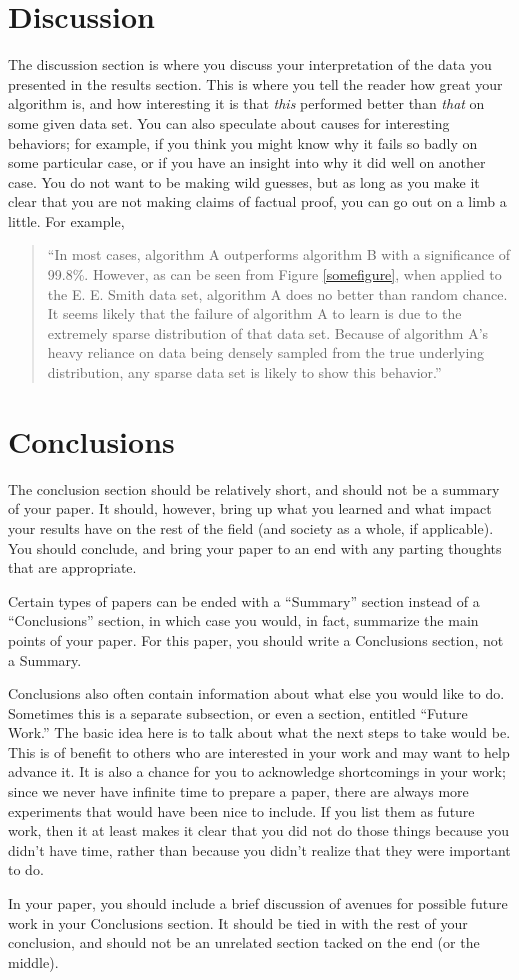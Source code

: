 \documentclass[12pt,letterpaper]{article}
\begin{document}
\section{Discussion}
The discussion section is where you discuss your interpretation of the data you
presented in the results section.  This is where you tell the reader how great
your algorithm is, and how interesting it is that \emph{this} performed better
than \emph{that} on some given data set.  You can also speculate about causes
for interesting behaviors; for example, if you think you might know why it fails
so badly on some particular case, or if you have an insight into why it did well
on another case.  You do not want to be making wild guesses, but as long as you
make it clear that you are not making claims of factual proof, you can go out on
a limb a little.  For example,

\begin{quote}
``In most cases, algorithm A outperforms algorithm B with a significance of
99.8\%.  However, as can be seen from Figure \ref{somefigure}, when applied to
the E. E. Smith data set, algorithm A does no better than random chance.  It
seems likely that the failure of algorithm A to learn is due to the extremely
sparse distribution of that data set.  Because of algorithm A's heavy reliance
on data being densely sampled from the true underlying distribution, any sparse
data set is likely to show this behavior.''
\end{quote}

\section{Conclusions}
The conclusion section should be relatively short, and should not be a summary
of your paper.  It should, however, bring up what you learned and what impact
your results have on the rest of the field (and society as a
whole, if applicable).  You should conclude, and bring your paper to an  end
with any parting thoughts that are appropriate.

Certain types of papers can be ended with a ``Summary'' section instead of a
``Conclusions'' section, in which case you would, in fact, summarize the main
points of your paper.  For this paper, you should write a Conclusions section,
not a Summary.

Conclusions also often contain information about what else you would like
to do.  Sometimes this is a separate subsection, or even a section, entitled
``Future Work.''  The basic idea here is to talk about what the next steps to
take would be.  This is of benefit to others who are interested in your
work and may want to help advance it.  It is also a chance for you to
acknowledge shortcomings in your work; since we never have infinite time to
prepare a paper, there are always more experiments that would have been nice to
include.  If you list them as future work, then it at least makes it clear that
you did not do those things because you didn't have time, rather than because you
didn't realize that they were important to do.

In your paper, you should include a brief discussion of avenues for possible
future work in your Conclusions section.  It should be tied in with the rest of
your conclusion, and should not be an unrelated section tacked on the end (or
the middle).



\end{document}
